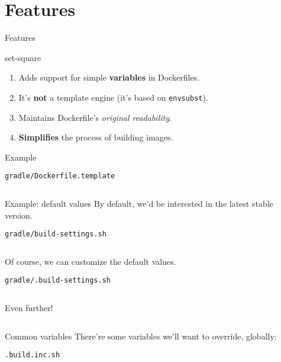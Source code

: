 \documentclass{beamer}
\begin{document}
\section{Features}

\begin{frame}{Features}
  \begin{block}{set-square}
    \begin{enumerate}
    \item Adds support for simple \textbf{variables} in Dockerfiles.
    \item It's \textbf{not} a template engine (it's based on \texttt{envsubst}).
    \item Maintains Dockerfile's \textit{original readability}.
    \item \textbf{Simplifies} the process of building images.
    \end{enumerate}
  \end{block}
\end{frame}

\begin{frame}{Example}
  \begin{block}{\texttt{gradle/Dockerfile.template}}
    \inputminted[fontsize=\small]{bash}{gradle.dockerfile}
  \end{block}
\end{frame}
  
\begin{frame}{Example: default values}
  By default, we'd be interested in the latest stable version.
  \begin{block}{\texttt{gradle/build-settings.sh}}
    \inputminted[fontsize=\small]{bash}{gradle.settings}
  \end{block}
  \pause

  Of course, we can customize the default values.
  \begin{exampleblock}{\texttt{gradle/.build-settings.sh}}
    \inputminted[fontsize=\small]{bash}{gradle.settings.inc}
  \end{exampleblock}
  \pause

  Even further!
  \begin{alertblock}{}
    \inputminted[fontsize=\small]{bash}{gradle.commandline}
  \end{alertblock}
\end{frame}

\begin{frame}{Common variables}
  There're some variables we'll want to override, globally:
  \begin{alertblock}{\texttt{.build.inc.sh}}
    \inputminted[fontsize=\small]{bash}{build.inc.sh}
  \end{alertblock}
\end{frame}
\end{document}
